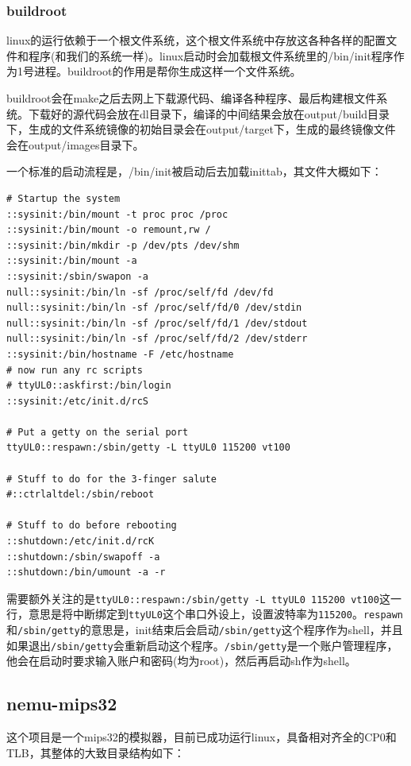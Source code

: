 \documentclass[lang=cn,11pt,a4paper]{elegantpaper}
\begin{document}
\subsubsection{buildroot}

linux的运行依赖于一个根文件系统，这个根文件系统中存放这各种各样的配置文件和程序(和我们的系统一样)。linux启动时会加载根文件系统里的/bin/init程序作为1号进程。buildroot的作用是帮你生成这样一个文件系统。

buildroot会在make之后去网上下载源代码、编译各种程序、最后构建根文件系统。下载好的源代码会放在dl目录下，编译的中间结果会放在output/build目录下，生成的文件系统镜像的初始目录会在output/target下，生成的最终镜像文件会在output/images目录下。

一个标准的启动流程是，/bin/init被启动后去加载inittab，其文件大概如下：
\begin{lstlisting}
# Startup the system
::sysinit:/bin/mount -t proc proc /proc
::sysinit:/bin/mount -o remount,rw /
::sysinit:/bin/mkdir -p /dev/pts /dev/shm
::sysinit:/bin/mount -a
::sysinit:/sbin/swapon -a
null::sysinit:/bin/ln -sf /proc/self/fd /dev/fd
null::sysinit:/bin/ln -sf /proc/self/fd/0 /dev/stdin
null::sysinit:/bin/ln -sf /proc/self/fd/1 /dev/stdout
null::sysinit:/bin/ln -sf /proc/self/fd/2 /dev/stderr
::sysinit:/bin/hostname -F /etc/hostname
# now run any rc scripts
# ttyUL0::askfirst:/bin/login
::sysinit:/etc/init.d/rcS

# Put a getty on the serial port
ttyUL0::respawn:/sbin/getty -L ttyUL0 115200 vt100

# Stuff to do for the 3-finger salute
#::ctrlaltdel:/sbin/reboot

# Stuff to do before rebooting
::shutdown:/etc/init.d/rcK
::shutdown:/sbin/swapoff -a
::shutdown:/bin/umount -a -r
\end{lstlisting}

需要额外关注的是\lstinline!ttyUL0::respawn:/sbin/getty -L ttyUL0 115200 vt100!这一行，意思是将中断绑定到\lstinline!ttyUL0!这个串口外设上，设置波特率为\lstinline!115200!。\lstinline!respawn!和\lstinline!/sbin/getty!的意思是，init结束后会启动\lstinline!/sbin/getty!这个程序作为shell，并且如果退出\lstinline!/sbin/getty!会重新启动这个程序。\lstinline!/sbin/getty!是一个账户管理程序，他会在启动时要求输入账户和密码(均为root)，然后再启动sh作为shell。

\subsection{nemu-mips32}

这个项目是一个mips32的模拟器，目前已成功运行linux，具备相对齐全的CP0和TLB，其整体的大致目录结构如下：
\end{document}
